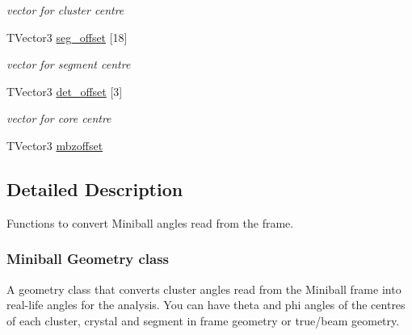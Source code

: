 \begin{DoxyCompactItemize}
\begin{DoxyCompactList}\small\item\em vector for cluster centre \end{DoxyCompactList}\item 
\hypertarget{class_m_b_geometry_a09539c16aa50b8a85866443ea0d8ffbd}{T\-Vector3 \hyperlink{class_m_b_geometry_a09539c16aa50b8a85866443ea0d8ffbd}{seg\-\_\-offset} \mbox{[}18\mbox{]}}\label{class_m_b_geometry_a09539c16aa50b8a85866443ea0d8ffbd}

\begin{DoxyCompactList}\small\item\em vector for segment centre \end{DoxyCompactList}\item 
\hypertarget{class_m_b_geometry_a4cf9fa07ab092a5956de7aaa78b37470}{T\-Vector3 \hyperlink{class_m_b_geometry_a4cf9fa07ab092a5956de7aaa78b37470}{det\-\_\-offset} \mbox{[}3\mbox{]}}\label{class_m_b_geometry_a4cf9fa07ab092a5956de7aaa78b37470}

\begin{DoxyCompactList}\small\item\em vector for core centre \end{DoxyCompactList}\item 
T\-Vector3 \hyperlink{class_m_b_geometry_a687268aeee7a0e2edc0486a76a07affe}{mbzoffset}
\end{DoxyCompactItemize}


\subsection{Detailed Description}
Functions to convert Miniball angles read from the frame. 



 \subsubsection*{Miniball Geometry class }

A geometry class that converts cluster angles read from the Miniball frame into real-\/life angles for the analysis. You can have theta and phi angles of the centres of each cluster, crystal and segment in frame geometry or true/beam geometry. 

